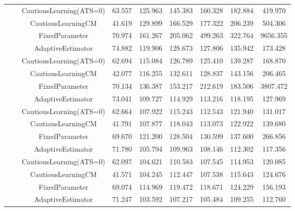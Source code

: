 \begin{table}[!h]
\begin{tabular}[t]{ccccccccc}
 &  & CautiousLearning(ATS=0) & 63.557 & 125.963 & 145.383 & 160.328 & 182.884 & 419.970\\

 &  & CautiousLearningCM & 41.619 & 129.899 & 166.529 & 177.322 & 206.239 & 504.306\\

 & \multirow[t]{-4}{*}{\centering\arraybackslash 0.35} & FixedParameter & 70.974 & 161.267 & 205.062 & 499.263 & 322.764 & 9656.355\\
\cmidrule{2-9}
 &  & AdaptiveEstimator & 74.882 & 119.906 & 128.673 & 127.806 & 135.942 & 173.428\\

 &  & CautiousLearning(ATS=0) & 62.694 & 115.084 & 126.789 & 125.410 & 139.287 & 168.870\\

 &  & CautiousLearningCM & 42.077 & 116.255 & 132.611 & 128.837 & 143.156 & 206.465\\

 & \multirow[t]{-4}{*}{\centering\arraybackslash 0.50} & FixedParameter & 70.134 & 136.387 & 153.217 & 212.619 & 183.506 & 3807.472\\
\cmidrule{2-9}
 &  & AdaptiveEstimator & 73.041 & 109.727 & 114.929 & 113.216 & 118.195 & 127.969\\

 &  & CautiousLearning(ATS=0) & 62.664 & 107.922 & 115.243 & 112.543 & 121.940 & 131.017\\

 &  & CautiousLearningCM & 41.791 & 107.877 & 118.043 & 113.073 & 122.922 & 139.680\\

 & \multirow[t]{-4}{*}{\centering\arraybackslash 0.75} & FixedParameter & 69.670 & 121.200 & 128.504 & 130.599 & 137.600 & 266.856\\
\cmidrule{2-9}
 &  & AdaptiveEstimator & 71.780 & 105.794 & 109.963 & 108.146 & 112.302 & 117.356\\

 &  & CautiousLearning(ATS=0) & 62.097 & 104.621 & 110.583 & 107.545 & 114.953 & 120.085\\

 &  & CautiousLearningCM & 41.571 & 104.245 & 112.447 & 107.538 & 115.643 & 124.676\\

 & \multirow[t]{-4}{*}{\centering\arraybackslash 1.00} & FixedParameter & 69.074 & 114.969 & 119.472 & 118.671 & 124.229 & 156.193\\
\cmidrule{2-9}
 &  & AdaptiveEstimator & 71.247 & 103.592 & 107.217 & 105.484 & 109.255 & 112.760\\


\end{tabular}
\end{table}
